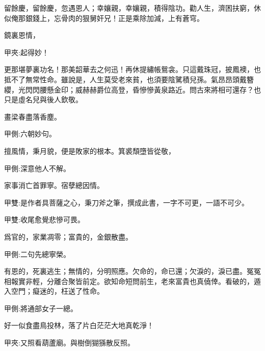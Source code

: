 \begin{qute2sp}
    留餘慶，留餘慶，忽遇恩人；幸孃親，幸孃親，積得陰功。勸人生，濟困扶窮，休似俺那銀錢上，忘骨肉的狠舅奸兄！正是乘除加減，上有蒼穹。
\end{qute2sp}


\begin{qute2sp}
    鏡裏恩情，\begin{note}甲夾:起得妙！\end{note}更那堪夢裏功名！那美韶華去之何迅！再休提繡帳鴛衾。只這戴珠冠，披鳳襖，也抵不了無常性命。雖說是，人生莫受老來貧，也須要陰騭積兒孫。氣昂昂頭戴簪纓，光閃閃腰懸金印；威赫赫爵位高登，昏慘慘黃泉路近。問古來將相可還存？也只是虛名兒與後人欽敬。
\end{qute2sp}


\begin{qute2sp}
    畫梁春盡落香塵。\begin{note}甲側:六朝妙句。\end{note}擅風情，秉月貌，便是敗家的根本。箕裘頹墮皆從敬，\begin{note}甲側:深意他人不解。\end{note}家事消亡首罪寧。宿孽總因情。\begin{note}甲雙:是作者具菩薩之心，秉刀斧之筆，撰成此書，一字不可更，一語不可少。\end{note}
\end{qute2sp}


\begin{qute2sp}
    \begin{note}甲雙:收尾愈覺悲慘可畏。\end{note}
    爲官的，家業凋零；富貴的，金銀散盡。\begin{note}甲側:二句先總寧榮。\end{note}有恩的，死裏逃生；無情的，分明照應。欠命的，命已還；欠淚的，淚已盡。冤冤相報實非輕，分離合聚皆前定。欲知命短問前生，老來富貴也真僥倖。看破的，遁入空門；癡迷的，枉送了性命。\begin{note}甲側:將通部女子一總。\end{note}好一似食盡鳥投林，落了片白茫茫大地真乾淨！\begin{note}甲夾:又照看葫蘆廟。與樹倒猢猻散反照。\end{note}
\end{qute2sp}


